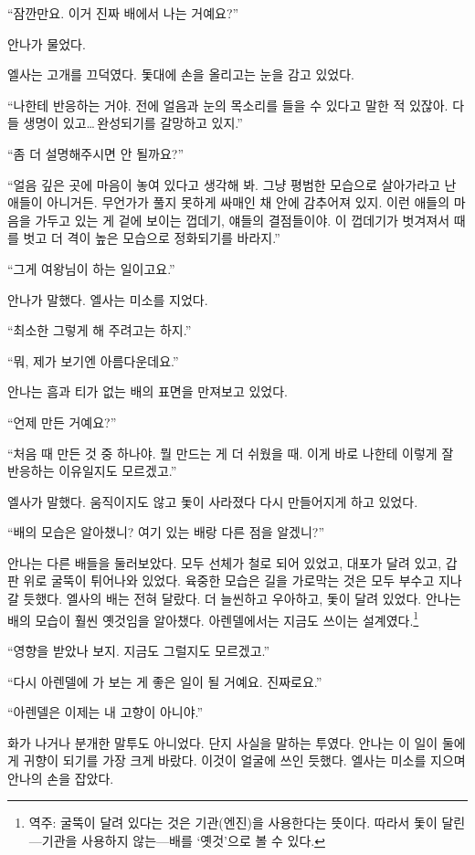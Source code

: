 ``잠깐만요. 이거 진짜 배에서 나는 거예요?''

안나가 물었다.

엘사는 고개를 끄덕였다. 돛대에 손을 올리고는 눈을 감고 있었다.

``나한테 반응하는 거야. 전에 얼음과 눈의 목소리를 들을 수 있다고 말한 적 있잖아. 다들 생명이 있고\ldots\,완성되기를 갈망하고 있지.''

``좀 더 설명해주시면 안 될까요?''

``얼음 깊은 곳에 마음이 놓여 있다고 생각해 봐. 그냥 평범한 모습으로 살아가라고 난 애들이 아니거든. 무언가가 풀지 못하게 싸매인 채 안에 감추어져 있지. 이런 애들의 마음을 가두고 있는 게 겉에 보이는 껍데기, 얘들의 결점들이야. 이 껍데기가 벗겨져서 때를 벗고 더 격이 높은 모습으로 정화되기를 바라지.''

``그게 여왕님이 하는 일이고요.''

안나가 말했다. 엘사는 미소를 지었다.

``최소한 그렇게 해 주려고는 하지.''

``뭐, 제가 보기엔 아름다운데요.''

안나는 흠과 티가 없는 배의 표면을 만져보고 있었다.

``언제 만든 거예요?''

``처음 때 만든 것 중 하나야. 뭘 만드는 게 더 쉬웠을 때. 이게 바로 나한테 이렇게 잘 반응하는 이유일지도 모르겠고.''

엘사가 말했다. 움직이지도 않고 돛이 사라졌다 다시 만들어지게 하고 있었다.

``배의 모습은 알아챘니? 여기 있는 배랑 다른 점을 알겠니?''

안나는 다른 배들을 둘러보았다. 모두 선체가 철로 되어 있었고, 대포가 달려 있고, 갑판 위로 굴뚝이 튀어나와 있었다. 육중한 모습은 길을 가로막는 것은 모두 부수고 지나갈 듯했다. 엘사의 배는 전혀 달랐다. 더 늘씬하고 우아하고, 돛이 달려 있었다. 안나는 배의 모습이 훨씬 옛것임을 알아챘다. 아렌델에서는 지금도 쓰이는 설계였다.\footnote{역주: 굴뚝이 달려 있다는 것은 기관(엔진)을 사용한다는 뜻이다. 따라서 돛이 달린—기관을 사용하지 않는—배를 `옛것'으로 볼 수 있다.}

``영향을 받았나 보지. 지금도 그럴지도 모르겠고.''

``다시 아렌델에 가 보는 게 좋은 일이 될 거예요. 진짜로요.''

``아렌델은 이제는 내 고향이 아니야.''

화가 나거나 분개한 말투도 아니었다. 단지 사실을 말하는 투였다. 안나는 이 일이 둘에게 귀향이 되기를 가장 크게 바랐다. 이것이 얼굴에 쓰인 듯했다. 엘사는 미소를 지으며 안나의 손을 잡았다.

